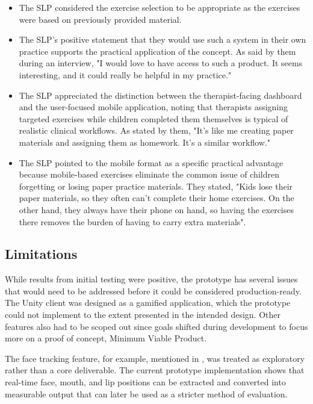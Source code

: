\begin{itemize}
    \item The SLP considered the exercise selection to be appropriate as the exercises were based on previously provided material.
    \item The SLP's positive statement that they would use such a system in their own practice supports the practical application of the concept. As said by them during an interview, "I would love to have access to such a product. It seems interesting, and it could really be helpful in my practice."
    \item The SLP appreciated the distinction between the therapist-facing dashboard and the user-focused mobile application, noting that therapists assigning targeted exercises while children completed them themselves is typical of realistic clinical workflows. As stated by them, "It's like me creating paper materials and assigning them as homework. It's a similar workflow."
    \item The SLP pointed to the mobile format as a specific practical advantage because mobile-based exercises eliminate the common issue of children forgetting or losing paper practice materials. They stated, "Kids lose their paper materials, so they often can't complete their home exercises. On the other hand, they always have their phone on hand, so having the exercises there removes the burden of having to carry extra materials".
\end{itemize}

\subsection{Limitations}
\label{subsec:limitations}

While results from initial testing were positive, the prototype has several issues that would need to be addressed before it could be considered production-ready. The Unity client was designed as a gamified application, which the prototype could not implement to the extent presented in the intended design. Other features also had to be scoped out since goals shifted during development to focus more on a proof of concept, Minimum Viable Product.

The face tracking feature, for example, mentioned in , was treated as exploratory rather than a core deliverable. The current prototype implementation shows that real-time face, mouth, and lip positions can be extracted and converted into measurable output that can later be used as a stricter method of evaluation.

